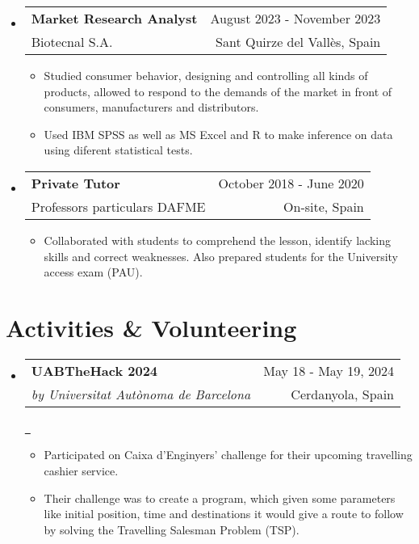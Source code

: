 \documentclass[a4paper,11pt,dvipsnames]{article}
\makeatletter
\newcommand{\espai}{\symbol{32}\symbol{32}\symbol{32}\symbol{32}\symbol{32}\symbol{32}\symbol{32}\symbol{32}\symbol{32}\symbol{32}\symbol{32}\symbol{32}\symbol{32}\symbol{32}\symbol{32}\symbol{32}\symbol{32}\symbol{32}\symbol{32}\symbol{32}\symbol{32}\symbol{32}\symbol{32}\symbol{32}\symbol{32}\symbol{32}\symbol{32}\symbol{32}\symbol{32}\symbol{32}\symbol{32}\symbol{32}\symbol{32}\symbol{32}\symbol{32}\symbol{32}\symbol{32}\symbol{32}\symbol{32}\symbol{32}\symbol{32}\symbol{32}\symbol{32}\symbol{32}\symbol{32}\symbol{32}\symbol{32}\symbol{32}\symbol{32}\symbol{32}\symbol{32}\symbol{32}\symbol{32}\symbol{32}\symbol{32}\symbol{32}\symbol{32}\symbol{32}\symbol{32}\symbol{32}\symbol{32}\symbol{32}\symbol{32}\symbol{32}\symbol{32}\symbol{32}\symbol{32}\symbol{32}\symbol{32}\symbol{32}\symbol{32}\symbol{32}\symbol{32}\symbol{32}\symbol{32}\symbol{32}\symbol{32}\symbol{32}\symbol{32}\symbol{32}\symbol{32}\symbol{32}\symbol{32}\symbol{32}\symbol{32}\symbol{32}\symbol{32}\symbol{32}\symbol{32}\symbol{32}\symbol{32}\symbol{32}\symbol{32}\symbol{32}\symbol{32}\symbol{32}\symbol{32}\symbol{32}\symbol{32}\symbol{32}\symbol{32}\symbol{32}\symbol{32}\symbol{32}\symbol{32}\symbol{32}\symbol{32}\symbol{32}\symbol{32}\symbol{32}\symbol{32}\symbol{32}\symbol{32}\symbol{32}\symbol{32}\symbol{32}\symbol{32}\symbol{32}\symbol{32}\symbol{32}\symbol{32}\symbol{32}\symbol{32}\symbol{32}\symbol{32}\symbol{32}\symbol{32}\symbol{32}\symbol{32}\symbol{32}\symbol{32}\symbol{32}\symbol{32}\symbol{32}\symbol{32}\symbol{32}\symbol{32}\symbol{32}\symbol{32}\symbol{32}\symbol{32}\symbol{32}\symbol{32}\symbol{32}\symbol{32}\symbol{32}\symbol{32}\symbol{32}\symbol{32}\symbol{32}\symbol{32}\symbol{32}\symbol{32}\symbol{32}\symbol{32}\symbol{32}\symbol{32}\symbol{32}\symbol{32}\symbol{32}\symbol{32}\symbol{32}\symbol{32}\symbol{32}\symbol{32}\symbol{32}\symbol{32}\symbol{32}\symbol{32}\symbol{32}\symbol{32}\symbol{32}\symbol{32}\symbol{32}\symbol{32}\symbol{32}\symbol{32}\symbol{32}\symbol{32}\symbol{32}\symbol{32}}
\newcommand{\resumeQuadHeading}[4]{
	\item
	\begin{tabular*}{0.96\textwidth}[t]{l@{\extracolsep{\fill}}r}
		\textbf{#1} & \small #2 \\
		\small#3 & \small #4 \\
	\end{tabular*}
}
\newcommand{\resumeHeadingListStart}{
	\begin{itemize}[leftmargin=0.15in, label={}]
	}
\newcommand{\resumeHeadingListEnd}{\end{itemize}}
\makeatother
\begin{document}
	\resumeHeadingListStart{}
	\resumeQuadHeading{Market Research Analyst \tcbox{\color{white}\textbf{IBM SPSS}}\hspace*{1mm} \tcbox{\color{white}\textbf{MS Excel}}\hspace*{1mm} \tcbox{\color{white}\textbf{R}}}{August 2023 - November 2023}
	{Biotecnal S.A.}{Sant Quirze del Vallès, Spain}
	\begin{itemize}[leftmargin=3em, itemsep=0.1em, topsep=2pt]
		\item \small Studied consumer behavior, designing and controlling all kinds of products, allowed to respond to the demands of the market in front of consumers, manufacturers and distributors.
		\item \small Used IBM SPSS as well as MS Excel and R to make inference on data using diferent statistical tests.
	\end{itemize}
	\resumeHeadingListEnd{}
	
	\resumeHeadingListStart{}
	\resumeQuadHeading{Private Tutor}{October 2018 - June 2020}
	{Professors particulars DAFME}{On-site, Spain}
	\begin{itemize}[leftmargin=3em, itemsep=0.1em, topsep=2pt]
		\item \small Collaborated with students to comprehend the lesson, identify lacking skills and correct weaknesses. Also prepared students for the University access exam (PAU).
	\end{itemize}
	\resumeHeadingListEnd{}
	
	\section{Activities \& Volunteering}
	\resumeHeadingListStart{}
	\resumeQuadHeading{UABTheHack 2024 \tcbox{\color{white}\textbf{Python}}\hspace*{1mm} \tcbox{\color{white}\textbf{Problem-solving}}\hspace*{1mm} \tcbox{\color{white}\textbf{Git}}}{May 18 - May 19, 2024}{\textit{by Universitat Autònoma de Barcelona}}{Cerdanyola, Spain}{\espai}{\href{https://github.com/Tutusaus/UABTheHack}{\faGithub \ }}
	\begin{itemize}[leftmargin=3em, itemsep=0.1em, topsep=2pt]
		\item \small Participated on Caixa d'Enginyers' challenge for their upcoming travelling cashier service.
		\item \small Their challenge was to create a program, which given some parameters like initial position, time and destinations it would give a route to follow by solving the Travelling Salesman Problem (TSP).
	\end{itemize}
	\resumeHeadingListEnd{}
	
\end{document}
